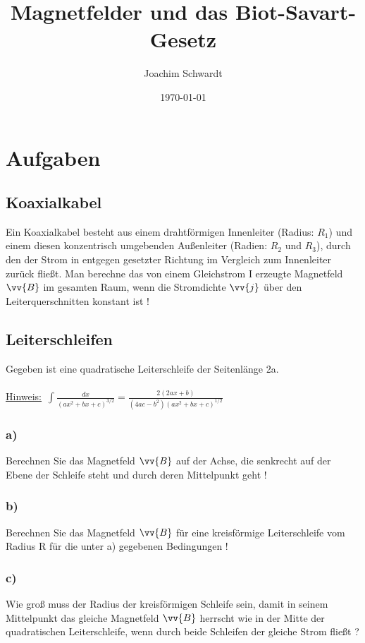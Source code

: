 \documentclass[a4paper,12pt]{article}
\begin{document}
\title{Magnetfelder und das Biot-Savart-Gesetz}
\author{Joachim Schwardt}
\date{\today}
\maketitle

\section{Aufgaben}
\subsection{Koaxialkabel}
Ein Koaxialkabel besteht aus einem drahtförmigen Innenleiter (Radius: $R_1$) und 
 einem diesen konzentrisch umgebenden Außenleiter (Radien: $R_2$  und $R_3$), durch 
 den  der  Strom  in  entgegen  gesetzter  Richtung  im  Vergleich  zum  Innenleiter 
 zurück fließt. 
Man berechne das von einem Gleichstrom I erzeugte Magnetfeld  $\vv{B}$ im gesamten 
 Raum, wenn die Stromdichte  $\vv{j}$ über den Leiterquerschnitten konstant ist ! 
\subsection{Leiterschleifen}
Gegeben ist eine quadratische Leiterschleife der Seitenlänge 2a.\\ \\
\underline{Hinweis:}\ $\int \frac{dx}{(ax^2+bx+c)^{3/2}}=\frac{2(2ax+b)}{(4ac-b^2)(ax^2+bx+c)^{1/2}}$
\subsubsection*{a)}
Berechnen Sie das Magnetfeld $\vv{B}$ auf der Achse, die senkrecht auf der    
 Ebene der Schleife steht und durch deren Mittelpunkt geht !
\subsubsection*{b)}
Berechnen  Sie  das  Magnetfeld $\vv{B}$ für  eine  kreisförmige  Leiterschleife 
 vom Radius R für die unter a) gegebenen Bedingungen !
\subsubsection*{c)}
Wie  groß  muss  der  Radius  der  kreisförmigen  Schleife  sein,  damit  in 
  seinem Mittelpunkt das gleiche Magnetfeld $\vv{B}$ herrscht wie in der Mitte 
  der  quadratischen  Leiterschleife,  wenn  durch  beide  Schleifen  der 
  gleiche Strom fließt ? 
\end{document}
